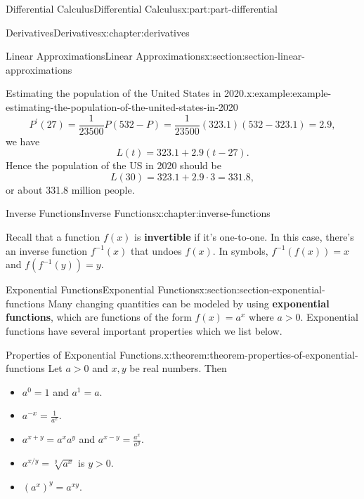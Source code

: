 \documentclass[twoside,10pt,]{book}
\newcommand{\terminology}[1]{\textbf{#1}}
\numberwithin{equation}{part}
\begin{document}
\begin{partptx}{Differential Calculus}{}{Differential Calculus}{}{}{x:part:part-differential}
\begin{chapterptx}{Derivatives}{}{Derivatives}{}{}{x:chapter:derivatives}
\begin{sectionptx}{Linear Approximations}{}{Linear Approximations}{}{}{x:section:section-linear-approximations}
\begin{example}{Estimating the population of the United States in 2020.}{x:example:example-estimating-the-population-of-the-united-states-in-2020}
\begin{equation*}
P^\prime(27) = \frac{1}{23500}P(532-P) = \frac{1}{23500}(323.1)(532-323.1) = 2.9,
\end{equation*}
we have%
\begin{equation*}
L(t) = 323.1 + 2.9(t-27).
\end{equation*}
Hence the population of the US in 2020 should be%
\begin{equation*}
L(30) = 323.1 + 2.9\cdot3 = 331.8,
\end{equation*}
or about 331.8 million people.%
\end{example}
\end{sectionptx}
\end{chapterptx}
%
\typeout{************************************************}
\typeout{************************************************}
%
\begin{chapterptx}{Inverse Functions}{}{Inverse Functions}{}{}{x:chapter:inverse-functions}
\begin{introduction}{}%
Recall that a function \(f(x)\) is \terminology{invertible} if it's one-to-one. In this case, there's an inverse function \(f^{-1}(x)\) that undoes \(f(x)\). In symbols, \(f^{-1}(f(x)) = x\) and \(f(f^{-1}(y)) = y\).%
\end{introduction}%
%
%
\typeout{************************************************}
\typeout{************************************************}
%
\begin{sectionptx}{Exponential Functions}{}{Exponential Functions}{}{}{x:section:section-exponential-functions}
Many changing quantities can be modeled by using \terminology{exponential functions}, which are functions of the form \(f(x) = a^{x}\) where \(a > 0\). Exponential functions have several important properties which we list below.%
\begin{theorem}{Properties of Exponential Functions.}{}{x:theorem:theorem-properties-of-exponential-functions}%
%
Let \(a > 0\) and \(x,y\) be real numbers. Then%
\begin{itemize}[label=\textbullet]
\item{}\(a^{0} = 1\) and \(a^{1} = a\).%
\item{}\(a^{-x} = \frac{1}{a^{x}}\).%
\item{}\(a^{x+y} = a^{x}a^{y}\) and \(a^{x-y} = \frac{a^{x}}{a^{y}}\).%
\item{}\(a^{x/y} = \sqrt[y]{a^{x}}\) is \(y > 0\).%
\item{}\((a^{x})^{y} = a^{xy}\).%

\end{itemize}
\end{theorem}
\end{sectionptx}
\end{chapterptx}
\end{partptx}
\end{document}
